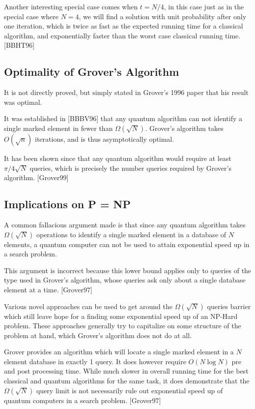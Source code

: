 \documentclass[]{article}
\begin{document}
Another interesting special case comes when $t = N/4$, in this case
just as in the special case where $N = 4$, we will find a solution
with unit probability after only one iteration, which is twice as fast
as the expected running time for a classical algorithm, and
exponentially faster than the worst case classical running time.
[BBHT96]

\subsection{Optimality of Grover's Algorithm}

It is not directly proved, but simply stated in Grover's 1996 paper
that his result was optimal.

It was established in [BBBV96] that any quantum algorithm can not
identify a single marked element in fewer than $\Omega(\sqrt{N})$.
Grover's algorithm takes $O(\sqrt{n})$ iterations, and is thus
asymptotically optimal.

It has been shown since that any quantum algorithm would require at
least $\pi/4 \sqrt{N}$ queries, which is precisely the number queries
required by Grover's algorithm. [Grover99]

\subsection{Implications on P = NP}

A common fallacious argument made is that since any quantum algorithm
takes $\Omega(\sqrt{N})$ operations to identify a single marked
element in a database of $N$ elements, a quantum computer can not be
used to attain exponential speed up in a search problem.

This argument is incorrect because this lower bound applies only to
queries of the type used in Grover's algorithm, whose queries ask only
about a single database element at a time. [Grover97]

Various novel approaches can be used to get around the
$\Omega(\sqrt{N})$ queries barrier which still leave hope for a
finding some exponential speed up of an NP-Hard problem.  These
approaches generally try to capitalize on some structure of the
problem at hand, which Grover's algorithm does not do at all.

Grover provides an algorithm which will locate a single marked element
in a $N$ element database in exactly 1 query.  It does however require
$O(N\log{N})$ pre and post processing time. While much slower in
overall running time for the best classical and quantum algorithms for
the same task, it does demonstrate that the $\Omega(\sqrt{N})$ query
limit is not necessarily rule out exponential speed up of quantum
computers in a search problem.  [Grover97]
\end{document}
